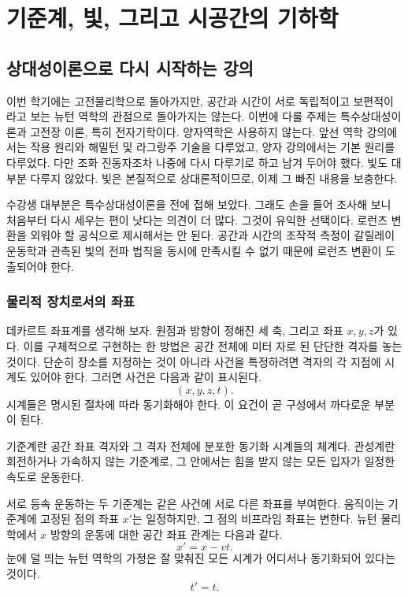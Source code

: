 \chapter{기준계, 빛, 그리고 시공간의 기하학}

\section{상대성이론으로 다시 시작하는 강의}

이번 학기에는 고전물리학으로 돌아가지만, 공간과 시간이 서로 독립적이고 보편적이라고 보는 뉴턴 역학의 관점으로 돌아가지는 않는다. 이번에 다룰 주제는 특수상대성이론과 고전장 이론, 특히 전자기학이다. 양자역학은 사용하지 않는다. 앞선 역학 강의에서는 작용 원리와 해밀턴 및 라그랑주 기술을 다루었고, 양자 강의에서는 기본 원리를 다루었다. 다만 조화 진동자조차 나중에 다시 다루기로 하고 남겨 두어야 했다. 빛도 대부분 다루지 않았다. 빛은 본질적으로 상대론적이므로, 이제 그 빠진 내용을 보충한다.

수강생 대부분은 특수상대성이론을 전에 접해 보았다. 그래도 손을 들어 조사해 보니 처음부터 다시 세우는 편이 낫다는 의견이 더 많다. 그것이 유익한 선택이다. 로런츠 변환을 외워야 할 공식으로 제시해서는 안 된다. 공간과 시간의 조작적 측정이 갈릴레이 운동학과 관측된 빛의 전파 법칙을 동시에 만족시킬 수 없기 때문에 로런츠 변환이 도출되어야 한다.

\subsection{물리적 장치로서의 좌표}

데카르트 좌표계를 생각해 보자. 원점과 방향이 정해진 세 축, 그리고 좌표 \(x,y,z\)가 있다. 이를 구체적으로 구현하는 한 방법은 공간 전체에 미터 자로 된 단단한 격자를 놓는 것이다. 단순히 장소를 지정하는 것이 아니라 사건을 특정하려면 격자의 각 지점에 시계도 있어야 한다. 그러면 사건은 다음과 같이 표시된다.
\begin{equation}
(x,y,z,t).
\end{equation}
시계들은 명시된 절차에 따라 동기화해야 한다. 이 요건이 곧 구성에서 까다로운 부분이 된다.

\begin{definition}
기준계란 공간 좌표 격자와 그 격자 전체에 분포한 동기화 시계들의 체계다. 관성계란 회전하거나 가속하지 않는 기준계로, 그 안에서는 힘을 받지 않는 모든 입자가 일정한 속도로 운동한다.
\end{definition}

서로 등속 운동하는 두 기준계는 같은 사건에 서로 다른 좌표를 부여한다. 움직이는 기준계에 고정된 점의 좌표 \(x'\)는 일정하지만, 그 점의 비프라임 좌표는 변한다. 뉴턴 물리학에서 \(x\) 방향의 운동에 대한 공간 좌표 관계는 다음과 같다.
\begin{equation}
x'=x-vt.
\label{eq:sr1-galilean-space}
\end{equation}
눈에 덜 띄는 뉴턴 역학의 가정은 잘 맞춰진 모든 시계가 어디서나 동기화되어 있다는 것이다.
\begin{equation}
t'=t.
\label{eq:sr1-absolute-time}
\end{equation}

